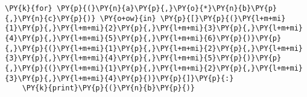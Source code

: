 \begin{Verbatim}[commandchars=\\\{\}]
\PY{k}{for} \PY{p}{(}\PY{n}{a}\PY{p}{,}\PY{o}{*}\PY{n}{b}\PY{p}{,}\PY{n}{c}\PY{p}{)} \PY{o+ow}{in} \PY{p}{[}\PY{p}{(}\PY{l+m+mi}{1}\PY{p}{,}\PY{l+m+mi}{2}\PY{p}{,}\PY{l+m+mi}{3}\PY{p}{,}\PY{l+m+mi}{4}\PY{p}{,}\PY{l+m+mi}{5}\PY{p}{,}\PY{l+m+mi}{6}\PY{p}{)}\PY{p}{,}\PY{p}{(}\PY{l+m+mi}{1}\PY{p}{,}\PY{l+m+mi}{2}\PY{p}{,}\PY{l+m+mi}{3}\PY{p}{,}\PY{l+m+mi}{4}\PY{p}{,}\PY{l+m+mi}{5}\PY{p}{)}\PY{p}{,}\PY{p}{(}\PY{l+m+mi}{1}\PY{p}{,}\PY{l+m+mi}{2}\PY{p}{,}\PY{l+m+mi}{3}\PY{p}{,}\PY{l+m+mi}{4}\PY{p}{)}\PY{p}{]}\PY{p}{:}
    \PY{k}{print}\PY{p}{(}\PY{n}{b}\PY{p}{)}
\end{Verbatim}
